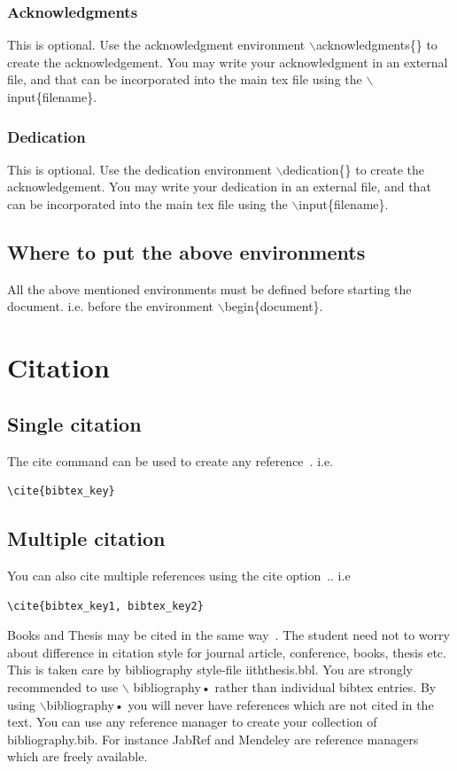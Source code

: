 \documentclass[a4paper,twoside]{iiththesis}
\begin{document}
\subsection{Acknowledgments}
This is optional. Use the acknowledgment environment $ \backslash $acknowledgments\{\}   to create the acknowledgement.
You may write your acknowledgment in an external file, and that can be incorporated into the main tex file using the $ \backslash $input\{filename\}.


\subsection{Dedication}
This is optional. Use the dedication environment $ \backslash $dedication\{\}   to create the acknowledgement.
You may write your dedication in an external file, and that can be incorporated into the main tex file using the $ \backslash $input\{filename\}.

\section{Where to put the above environments}
All the above mentioned environments must be defined before starting the document. i.e. before the environment
 $ \backslash $begin\{document\}.

\chapter{Citation}
\section{Single citation}
The cite command can be used to create any reference~\cite{Achenbach1995}. i.e. 
\begin{verbatim}
\cite{bibtex_key}
\end{verbatim}


\section{Multiple citation}
You can also cite multiple references using the cite option~\cite{Achenbach1995,Aguiar2004}.. i.e
\begin{verbatim}
\cite{bibtex_key1, bibtex_key2}
\end{verbatim}

Books and Thesis may be cited in the same way~\cite{Bard2001,Iordanidis2002}. The student need not to worry about difference in citation style for journal article, conference, books, thesis etc. This is taken care by bibliography style-file iiththesis.bbl. You are strongly recommended to use $ \backslash $ bibliography{•} rather than individual bibtex entries. By using $ \backslash $bibliography{•} you will never have references which are not cited in the text. You can use any reference manager to create your collection of bibliography.bib. For instance JabRef and Mendeley are reference managers which are freely available.
\end{document}
